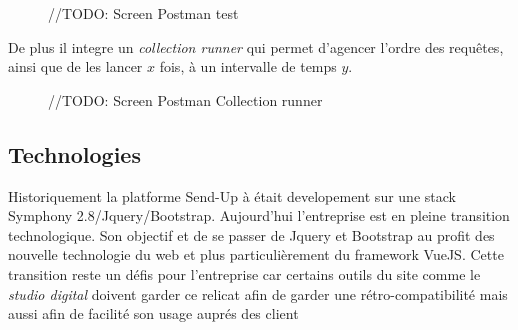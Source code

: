 \begin{figure}[htbp]
    \center
        //TODO: Screen Postman test
\end{figure}

De plus il integre un \textit{collection runner} qui permet d'agencer l'ordre des requêtes, ainsi que de les lancer $x$ fois, à un intervalle de temps $y$. 

\begin{figure}[htbp]
    \center
        //TODO: Screen Postman Collection runner
\end{figure}

\subsection{Technologies}

Historiquement la platforme Send-Up à était developement sur une stack Symphony 2.8/Jquery/Bootstrap. Aujourd'hui l'entreprise est en pleine transition technologique. Son objectif et de se passer de Jquery et Bootstrap au profit des nouvelle technologie du web et plus particulièrement du framework VueJS. Cette transition reste un défis pour l'entreprise car certains outils du site comme le \textit{studio digital} doivent garder ce relicat afin de garder une rétro-compatibilité mais aussi afin de facilité son usage auprés des client

